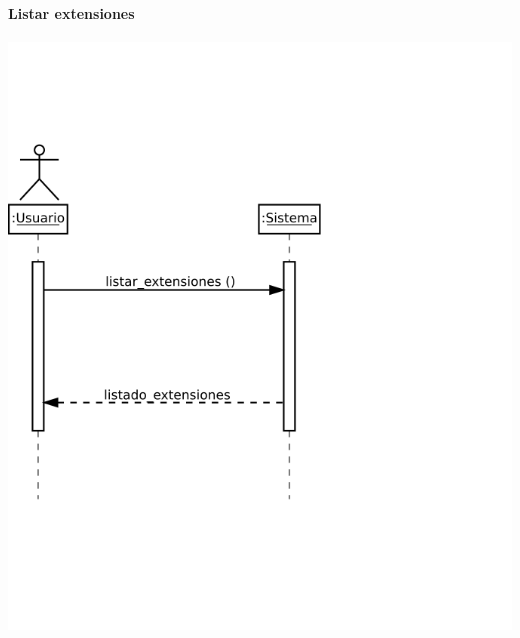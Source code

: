 \paragraph{Listar extensiones}
\begin{center}
\includegraphics[scale=0.4]{listar_extensiones.png} \\
\end{center}

